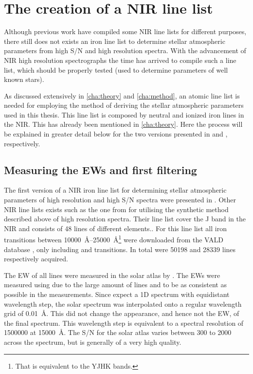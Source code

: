 \section{The creation of a NIR line list}
\label{sec:linelist_first}

Although previous work have compiled some NIR line
lists for different purposes, there still does not exists an iron line list to determine stellar
atmospheric parameters from high S/N and high resolution spectra. With the advancement of NIR high
resolution spectrographs the time has arrived to compile such a line list, which should be properly
tested (used to determine parameters of well known stars).

As discussed extensively in \cref{cha:theory} and \cref{cha:method}, an atomic line list is needed
for employing the method of deriving the stellar atmospheric parameters used in this thesis. This
line list is composed by neutral and ionized iron lines in the NIR. This has already been mentioned
in \cref{cha:theory}. Here the process will be explained in greater detail below for the two
versions presented in \citet{Andreasen2016} and \citet{Andreasen2017b}, respectively.


\subsection{Measuring the EWs and first filtering}

The first version of a NIR iron line list for determining stellar atmospheric parameters of high
resolution and high S/N spectra were presented in \citet{Andreasen2016}. Other NIR line lists exists
such as the one from \citet{Onehag2012,Lindgren2016} for utilising the synthetic method described
above of high resolution spectra. Their line list cover the J band in the NIR and consists of 48
lines of different elements.. For this line
list all iron transitions between \SIrange{10000}{25000}{\angstrom}\footnote{That is equivalent to
the YJHK bands.} were downloaded from the VALD database \citep{VALD1,VALD2}, only including
 and  transitions. In total were \num{50198}  and \num{28339}
 lines respectively acquired.

The EW of all lines were measured in the solar atlas by \citet{Hinkle1995}. The EWs were measured
using  due to the large amount of lines and to be as consistent as possible in the
measurements. Since  expect a 1D spectrum with equidistant wavelength step, the solar
spectrum was interpolated onto a regular wavelength grid of \SI{0.01}{\angstrom}. This did not
change the appearance, and hence not the EW, of the final spectrum. This wavelength step is
equivalent to a spectral resolution of \num{1500000} at \SI{15000}{\angstrom}. The S/N for the solar
atlas varies between 300 to 2000 across the spectrum, but is generally of a very high quality.

